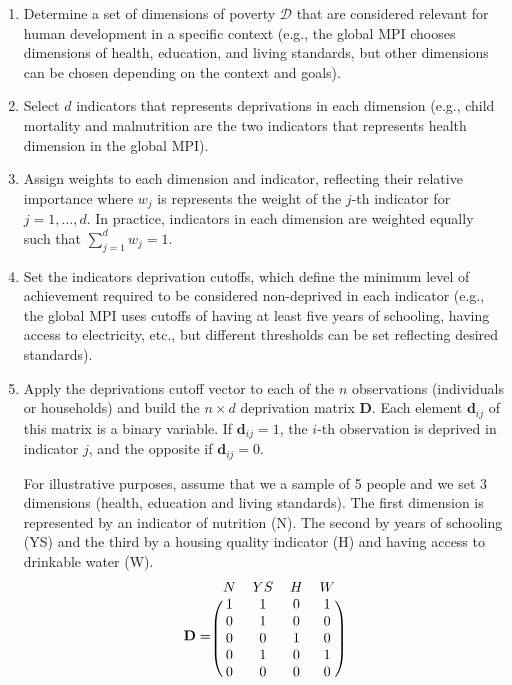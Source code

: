 \begin{enumerate}
\item Determine a set of dimensions of poverty $\mathcal{D}$ that are considered relevant for human development in a specific context (e.g., the global MPI chooses dimensions of health, education, and living standards, but other dimensions can be chosen depending on the context and goals).
\item Select $d$ indicators that represents deprivations in each dimension (e.g., child mortality and malnutrition are the two indicators that represents health dimension in the global MPI).  
\item Assign weights to each dimension and indicator, reflecting their relative importance where $w_j$ is represents the weight of the $j$-th indicator for $j = 1,\ldots,d$. In practice, indicators in each dimension are weighted equally such that $\sum_{j=1}^d w_j = 1$.
\item Set the indicators deprivation cutoffs, which define the minimum level of achievement required to be considered non-deprived in each indicator (e.g., the global MPI uses cutoffs of having at least five years of schooling, having access to electricity, etc., but different thresholds can be set reflecting desired standards). 
\item Apply the deprivations cutoff vector to each of the $n$ observations (individuals or households) and build the $n \times d$ deprivation matrix $\mathbf{D}$. Each element $\mathbf{d}_{ij}$ of this matrix is a binary variable. If $\mathbf{d}_{ij} = 1$, the $i$-th observation is deprived in indicator $j$, and the opposite if $\mathbf{d}_{ij} = 0$. 

For illustrative purposes, assume that we a sample of 5 people and we set 3 dimensions (health, education and living standards). The first dimension is represented by an indicator of nutrition (N). The second by years of schooling (YS) and the third by a housing quality indicator (H) and having access to drinkable water (W). 
\[ \mathbf{D} = 
\begin{blockarray}{cccc}
N & YS & H & W \\
\begin{block}{(cccc)}
  1 & 1 & 0 & 1 \\
  0 & 1 & 0 & 0 \\
  0 & 0 & 1 & 0 \\
  0 & 1 & 0 & 1 \\
  0 & 0 & 0 & 0 \\
\end{block}
\end{blockarray}
\]


\end{enumerate}
